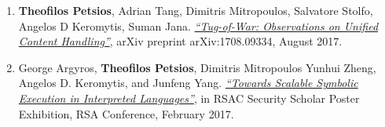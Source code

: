 \begin{cvparagraph}
\begin{enumerate}[label=O\arabic*]
    \item \textbf{Theofilos Petsios}, Adrian Tang, Dimitris Mitropoulos, Salvatore Stolfo, Angelos D Keromytis, Suman Jana. \href{https://arxiv.org/pdf/1708.09334.pdf}{\textit{``Tug-of-War: Observations on Unified Content Handling''}}, arXiv preprint arXiv:1708.09334, August 2017.
    \item George Argyros, \textbf{Theofilos Petsios}, Dimitris Mitropoulos
        Yunhui Zheng, Angelos D. Keromytis, and Junfeng Yang.
        \href{https://www.rsaconference.com/writable/files/About/towards_scalable_symbolic_execution_in_interpreted_languages.pdf}{\textit{``Towards Scalable Symbolic Execution in Interpreted Languages''}}, in RSAC Security Scholar Poster Exhibition, RSA Conference, February 2017.
        \label{itm:poster_arpegio}
\end{enumerate}
\end{cvparagraph}
